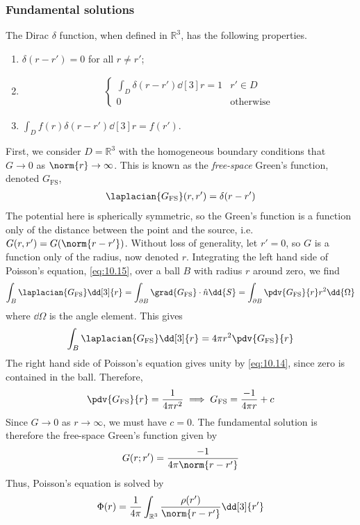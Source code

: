 \subsubsection{Fundamental solutions}
The Dirac $\delta$ function, when defined in $\mathbb R^3$, has the following properties.
\begin{enumerate}
	\item $\delta(r - r') = 0$ for all $r \neq r'$;
	\item \begin{align} \label{eq:10.14}
		\begin{cases}
			\int_D \delta(r - r') \dd[3]{r} = 1 & r' \in D \\
			0 & \text{otherwise}
		\end{cases}
	\end{align}
	\item $\int_D f(r) \delta(r - r') \dd[3]{r} = f(r')$.
\end{enumerate}
First, we consider $D = \mathbb R^3$ with the homogeneous boundary conditions that $G \to 0$ as $\norm{r} \to \infty$.
This is known as the \textit{free-space} Green's function, denoted $G_{\mathrm{FS}}$,
\begin{align} \label{eq:10.15}
	\laplacian{G_{\mathrm{FS}}}(r, r') = \delta(r - r')
\end{align}
The potential here is spherically symmetric, so the Green's function is a function only of the distance between the point and the source, i.e. $G(r, r') = G(\norm{r - r'})$.
Without loss of generality, let $r' = 0$, so $G$ is a function only of the radius, now denoted $r$.
Integrating the left hand side of Poisson's equation, \cref{eq:10.15}, over a ball $B$ with radius $r$ around zero, we find
\begin{align*}
	\int_B \laplacian{G_{\mathrm{FS}}} \dd[3]{r} = \int_{\partial B} \grad{G_{\mathrm{FS}}} \cdot \hat n \dd{S} = \int_{\partial B} \pdv{G_{\mathrm{FS}}}{r} r^2 \dd{\Omega}
\end{align*}
where $\dd{\Omega}$ is the angle element.
This gives
\begin{align*}
	\int_B \laplacian{G_{\mathrm{FS}}} \dd[3]{r} = 4 \pi r^2 \pdv{G_{\mathrm{FS}}}{r}
\end{align*}
The right hand side of Poisson's equation gives unity by \cref{eq:10.14}, since zero is contained in the ball.
Therefore,
\begin{align*}
	\pdv{G_{\mathrm{FS}}}{r} = \frac{1}{4 \pi r^2} \implies G_{\mathrm{FS}} = \frac{-1}{4 \pi r} + c
\end{align*}
Since $G \to 0$ as $r \to \infty$, we must have $c = 0$.
The fundamental solution is therefore the free-space Green's function given by
\begin{align} \label{eq:10.16}
	G(r; r') = \frac{-1}{4 \pi \norm{r - r'}}
\end{align}
Thus, Poisson's equation is solved by
\begin{align*}
	\Phi(r) = \frac{1}{4 \pi} \int_{\mathbb R^3} \frac{\rho(r')}{\norm{r - r'}} \dd[3]{r'}
\end{align*}

